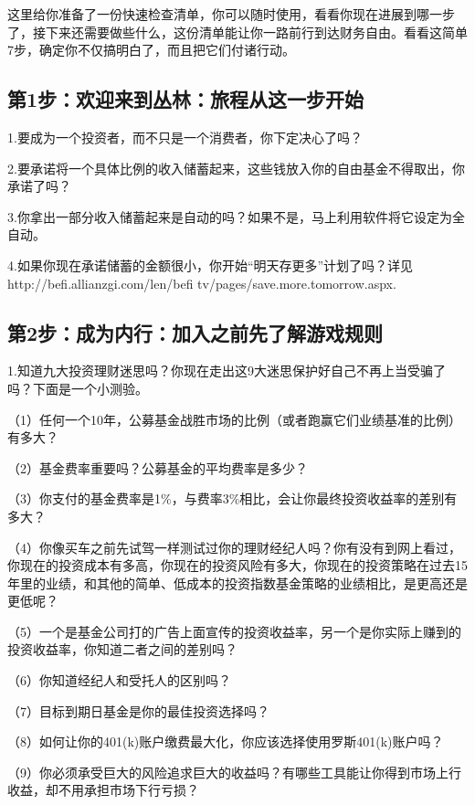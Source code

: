 

这里给你准备了一份快速检查清单，你可以随时使用，看看你现在进展到哪一步了，接下来还需要做些什么，这份清单能让你一路前行到达财务自由。看看这简单7步，确定你不仅搞明白了，而且把它们付诸行动。

\subsection{第1步：欢迎来到丛林：旅程从这一步开始}

1.要成为一个投资者，而不只是一个消费者，你下定决心了吗？

2.要承诺将一个具体比例的收入储蓄起来，这些钱放入你的自由基金不得取出，你承诺了吗？

3.你拿出一部分收入储蓄起来是自动的吗？如果不是，马上利用软件将它设定为全自动。

4.如果你现在承诺储蓄的金额很小，你开始“明天存更多”计划了吗？详见http://befi.allianzgi.com/len/befi tv/pages/save.more.tomorrow.aspx.

\subsection{第2步：成为内行：加入之前先了解游戏规则}

1.知道九大投资理财迷思吗？你现在走出这9大迷思保护好自己不再上当受骗了吗？下面是一个小测验。

（1）任何一个10年，公募基金战胜市场的比例（或者跑赢它们业绩基准的比例）有多大？

（2）基金费率重要吗？公募基金的平均费率是多少？

（3）你支付的基金费率是1\%，与费率3\%相比，会让你最终投资收益率的差别有多大？

（4）你像买车之前先试驾一样测试过你的理财经纪人吗？你有没有到网上看过，你现在的投资成本有多高，你现在的投资风险有多大，你现在的投资策略在过去15年里的业绩，和其他的简单、低成本的投资指数基金策略的业绩相比，是更高还是更低呢？

（5）一个是基金公司打的广告上面宣传的投资收益率，另一个是你实际上赚到的投资收益率，你知道二者之间的差别吗？

（6）你知道经纪人和受托人的区别吗？

（7）目标到期日基金是你的最佳投资选择吗？

（8）如何让你的401(k)账户缴费最大化，你应该选择使用罗斯401(k)账户吗？

（9）你必须承受巨大的风险追求巨大的收益吗？有哪些工具能让你得到市场上行收益，却不用承担市场下行亏损？

